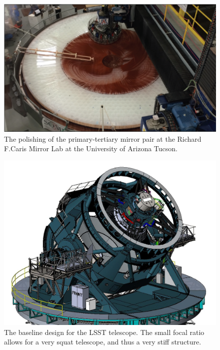 \begin{figure}
\includegraphics[width=1.0\hsize,clip]{polishing.pdf}
\caption{The polishing of the primary-tertiary mirror pair at the Richard F.Caris Mirror Lab at the University of Arizona Tucson. } 
\label{Fig:polishing}
\end{figure}




\begin{figure}
\includegraphics[width=1.0\hsize,clip]{TMA_Image-Oct-2017.JPG}
\caption{The baseline design for the 
LSST telescope.  The small focal ratio allows for a very squat
telescope, and thus a very stiff structure.  } 
\label{Fig:telescope}
\end{figure}



